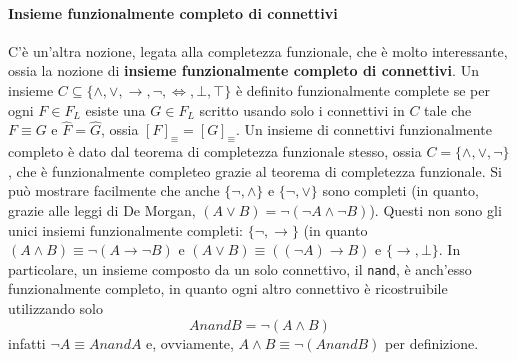 \paragraph{Insieme funzionalmente completo di connettivi}
C'è un'altra nozione, legata alla completezza funzionale, che è molto interessante, 
ossia la nozione di \textbf{insieme funzionalmente completo di connettivi}. Un 
insieme $C \subseteq \{\land, \lor, \rightarrow, \neg, \iff, \bot, \top\}$ 
è definito funzionalmente complete se per ogni $F \in F_L$ esiste una $G \in F_L$ 
scritto usando solo i connettivi in $C$ tale che $F \equiv G$ e $\hat{F} = \hat{G}$, 
ossia $[F]_{\equiv} = [G]_{\equiv}$. Un insieme di connettivi funzionalmente 
completo è dato dal teorema di completezza funzionale stesso, ossia 
$C = \{\land, \lor, \neg\}$, che è funzionalmente completeo grazie 
al teorema di completezza funzionale. Si può mostrare facilmente che 
anche $\{\neg, \land\}$ e $\{\neg, \lor\}$ sono completi (in quanto, grazie alle 
leggi di De Morgan, $(A \lor B) = \neg (\neg A \land \neg B)$). Questi non 
sono gli unici insiemi funzionalmente completi: 
$\{\neg, \rightarrow\}$ (in quanto $(A \land B) \equiv \neg (A \rightarrow \neg B)$ 
e $(A \lor B) \equiv ((\neg A) \rightarrow B)$ 
e $\{\rightarrow, \bot\}$. In particolare, un insieme composto da un 
solo connettivo, il \texttt{nand}, è anch'esso funzionalmente completo, 
in quanto ogni altro connettivo è ricostruibile utilizzando solo 
$$
A nand B = \neg (A \land B)
$$
infatti $\neg A \equiv A nand A$ e, ovviamente, $A \land B \equiv \neg ( A nand B)$ 
per definizione. 

